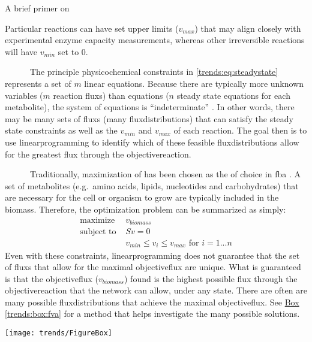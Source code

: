 \begin{pabox}[label=trends:box:fba,float*=h!,width=\textwidth]{A brief primer on }
\begin{multicols}{2}
Particular reactions can have set upper limits ($v_{max}$) that 
may align closely with experimental enzyme capacity measurements, 
whereas other irreversible reactions will have $v_{min}$ set to 0.

~~~~~~The principle physicochemical constraints in \autoref{trends:eq:steadystate} 
represents a set of $m$ linear equations. 
Because there are typically more unknown variables ($m$ reaction \glspl{flux}) than equations ($n$ steady state
equations for each metabolite), the system of equations is ``indeterminate'' \cite{Lee:2006je}.
In other words, there may be many sets of \glspl{flux} (many \glspl{fluxdistribution}) that 
can satisfy the steady state constraints as well as the $v_{min}$ and $v_{max}$ of each reaction.
The goal then is to use \gls{linearprogramming} to identify which of these feasible \glspl{fluxdistribution}
allow for the greatest \gls{flux} through the \gls{objectivereaction}.

~~~~~~Traditionally, maximization of  has been 
chosen as the  of choice in \gls{fba} \cite{Lee:2006je}. A set 
of metabolites (e.g.\ amino acids, lipids, nucleotides and 
carbohydrates) that are necessary for the cell or organism 
to grow are typically included in the \gls{biomass}. 
Therefore, the optimization problem can be summarized as simply:
\begin{alignat*}{2}
\text{maximize  }   & v_{biomass}  \\
\text{subject to  } & Sv=0 \\
                   & v_{min} \leq v_i \leq v_{max} \text{ for } i=1...n
\end{alignat*}
Even with these constraints, \gls{linearprogramming} does not guarantee that the set of \glspl{flux} that
allow for the maximal \gls{objectiveflux} are unique. What is 
guaranteed is that the \gls{objectiveflux} ($v_{biomass}$) found is the
highest possible \gls{flux} through the \gls{objectivereaction} that the network can allow, under any state.
There are often are many possible \glspl{fluxdistribution} that achieve
the maximal \gls{objectiveflux}. See \hyperref[trends:box:fva]{Box \ref{trends:box:fva}} for
a method that helps investigate the many possible solutions.


  \centering
  \texttt{[image: trends/FigureBox]}
  \label{trends:figbox}

\end{multicols}

\end{pabox}